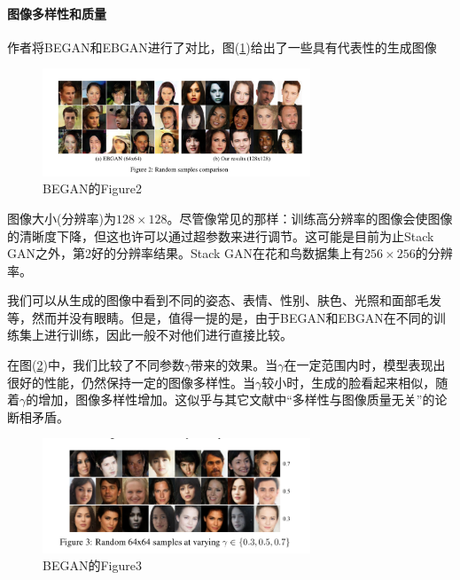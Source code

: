             \paragraph{图像多样性和质量}作者将BEGAN和EBGAN进行了对比，图(\ref{fig:BEGAN的Figure2})给出了一些具有代表性的生成图像
                \begin{figure}[H]
                \centering
                \includegraphics[width=8cm]{images/BEGAN_Figure2.jpg}
                \caption{BEGAN的Figure2}
                \label{fig:BEGAN的Figure2}
                \end{figure}
            图像大小(分辨率)为$128\times 128$。尽管像常见的那样：训练高分辨率的图像会使图像的清晰度下降，但这也许可以通过超参数来进行调节。这可能是目前为止Stack GAN之外，第2好的分辨率结果。Stack GAN在花和鸟数据集上有$256\times 256$的分辨率。
            \par
            我们可以从生成的图像中看到不同的姿态、表情、性别、肤色、光照和面部毛发等，然而并没有眼睛。但是，值得一提的是，由于BEGAN和EBGAN在不同的训练集上进行训练，因此一般不对他们进行直接比较。
            \par
            在图(\ref{fig:BEGAN的Figure3})中，我们比较了不同参数$\gamma$带来的效果。当$\gamma$在一定范围内时，模型表现出很好的性能，仍然保持一定的图像多样性。当$\gamma$较小时，生成的脸看起来相似，随着$\gamma$的增加，图像多样性增加。这似乎与其它文献中“多样性与图像质量无关”的论断相矛盾。
                \begin{figure}[H]
                \centering
                \includegraphics[width=8cm]{images/BEGAN_Figure3.jpg}
                \caption{BEGAN的Figure3}
                \label{fig:BEGAN的Figure3}
                \end{figure}
